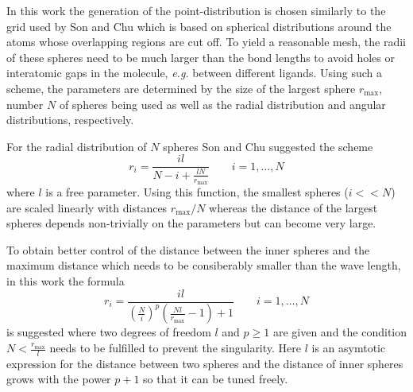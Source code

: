 In this work the generation of the point-distribution is chosen similarly to the grid used by Son and Chu \cite{Son_Chu} which is based on spherical distributions around the atoms whose overlapping regions are cut off.
To yield a reasonable mesh, the radii of these spheres need to be much larger than the bond lengths to avoid holes or interatomic gaps in the molecule, \textit{e.g.} between different ligands.
Using such a scheme, the parameters are determined by the size of the largest sphere $r_\text{max}$, number $N$ of spheres being used as well as the radial distribution and angular distributions, respectively.

For the radial distribution of $N$ spheres Son and Chu \cite{Son_Chu0} suggested the scheme
\begin{equation} \label{eq:son_map}
r_i=\frac{il}{N-i+\frac{lN}{r_\text{max}}} \qquad i=1,\hdots ,N 
\end{equation}
where $l$ is a free parameter.
Using this function, the smallest spheres ($i<<N$) are scaled linearly with distances $r_\text{max}/N$ whereas the distance of the largest spheres depends non-trivially on the parameters but can become very large.

To obtain better control of the distance between the inner spheres and the maximum distance which needs to be consiberably smaller than the wave length, in this work the formula
\begin{equation} \label{eq:tm_map}
r_i=\frac{il}{\left( \frac Ni \right)^p \left(\frac{Nl}{r_\text{max}}-1\right) +1} \qquad i=1,\hdots ,N 
\end{equation}
is suggested where two degrees of freedom $l$ and $p\geq 1$ are given and the condition $N<\frac{r_\text{max}}{l}$ needs to be fulfilled to prevent the singularity.
Here $l$ is an asymtotic expression for the distance between two spheres and the distance of inner spheres grows with the power $p+1$ so that it can be tuned freely.


